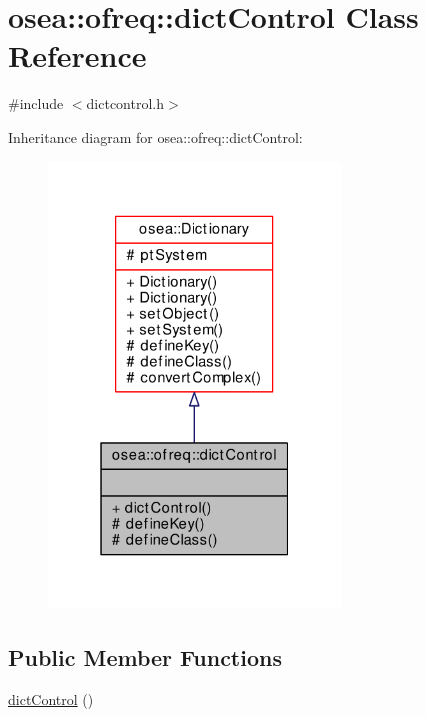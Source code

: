 \hypertarget{classosea_1_1ofreq_1_1dict_control}{\section{osea\-:\-:ofreq\-:\-:dict\-Control Class Reference}
\label{classosea_1_1ofreq_1_1dict_control}
}


{\ttfamily \#include $<$dictcontrol.\-h$>$}



Inheritance diagram for osea\-:\-:ofreq\-:\-:dict\-Control\-:\nopagebreak
\begin{figure}[H]
\begin{center}
\leavevmode
\includegraphics[width=220pt]{classosea_1_1ofreq_1_1dict_control__inherit__graph}
\end{center}
\end{figure}
\subsection*{Public Member Functions}
\begin{DoxyCompactItemize}
\item 
\hyperlink{classosea_1_1ofreq_1_1dict_control_a77963b6f01bf653ce573862d67e0fe10}{dict\-Control} ()
\end{DoxyCompactItemize}
